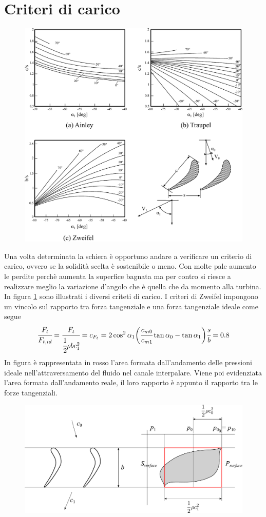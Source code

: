 \section{Criteri di carico}
\begin{figure}
\centering
  \includegraphics[width=\textwidth]{fig/Ainley.pdf}
\caption{}
\label{fig:Ainley}
\end{figure}
Una volta determinata la schiera è opportuno andare a verificare un criterio di carico, ovvero se la solidità scelta è sostenibile o meno. Con molte pale aumento le perdite perchè aumenta la superfice bagnata ma per contro si riesce a realizzare meglio la variazione d'angolo che è quella che da momento alla turbina. In figura \ref{fig:Ainley} sono illustrati i diversi criteti di carico. I criteri di Zweifel impongono un vincolo sul rapporto tra forza tangenziale e una forza tangenziale ideale come segue
\begin{align*}
\cfrac{F_t}{F_{t,id}} = \cfrac{F_t}{\cfrac{1}{2} \rho b c_1^2} = c_{F_t} = 2 \cos^2 \alpha_1 \bigg(\cfrac{c_{m0}}{c_{m1}} \tan \alpha_0 - \tan \alpha_1 \bigg) \cfrac{s}{b} = 0.8
\end{align*}
In figura è rappresentata in rosso l'area formata dall'andamento delle pressioni ideale nell'attraversamento del fluido nel canale interpalare. Viene poi evidenziata l'area formata dall'andamento reale, il loro rapporto è appunto il rapporto tra le forze tangenziali.
\begin{figure}
\centering
  \includegraphics[width=\textwidth]{fig/CritCaricoT.pdf}
\caption{}
\label{fig:CritCaricoT}
\end{figure}
